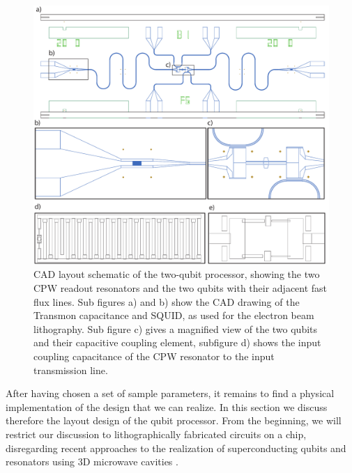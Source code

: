 \begin{figure}[ht!]
	\centering
	\includegraphics[width=\textwidth]{./material/figures/2-qubit-processor/fabrication/qubit_processor_layout}
	\caption[]{CAD layout schematic of the two-qubit processor, showing the two CPW readout resonators and the two qubits with their adjacent fast flux lines. Sub figures a) and b) show the CAD drawing of the Transmon capacitance and SQUID, as used for the electron beam lithography. Sub figure c) gives a magnified view of the two qubits and their capacitive coupling element, subfigure d) shows the input coupling capacitance of the CPW resonator to the input transmission line.}
	\label{fig:processor_fabrication}
\end{figure}

After having chosen a set of sample parameters, it remains to find a physical implementation of the design that we can realize. In this section we discuss therefore the layout design of the qubit processor. From the beginning, we will restrict our discussion to lithographically fabricated circuits on a chip, disregarding recent approaches to the realization of superconducting qubits and resonators using 3D microwave cavities \citep{paik_observation_2011}.

\smallskip

